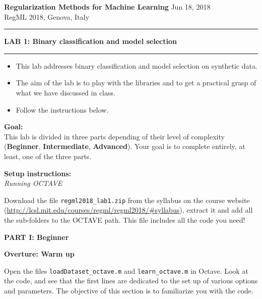 \documentclass[DIN, pagenumber=false, fontsize=11pt, parskip=half]{scrartcl}
\newcommand{\mytitle}[1]{{\noindent\LARGE\textbf{#1}}}
\newcommand{\mysection}[1]{\noindent\large\textbf{#1}}
\begin{document}
\noindent\textbf{Regularization Methods for Machine Learning} \hfill Jun 18, 2018\\
RegML 2018, Genova, Italy \\ \rule{\textwidth}{1pt}

\mytitle{LAB 1: Binary classification and model selection}
\rule{\textwidth}{1pt}
\begin{itemize}\itemsep1pt \parskip0pt 
  \item This lab addresses binary classification and model selection on synthetic data.
  \item The aim of the lab is to play with the libraries and to get a practical grasp of what we have discussed in class.
  \item Follow the instructions below.

\end{itemize}

\begin{framed}
\textbf{\textbf{Goal}:} \\
This lab is divided in three parts depending of their level of complexity (\textbf{Beginner}, \textbf{Intermediate}, \textbf{Advanced}). Your goal is to complete entirely, at least, one of the three parts.
\end{framed}


\begin{framed}
\textbf{\textbf{Setup instructions}:} \\
\textit{Running OCTAVE}

 Download the file \texttt{regml2018\_lab1.zip} from the syllabus on the course website (\url{http://lcsl.mit.edu/courses/regml/regml2018/\#syllabus}), extract it and add all the sub-folders to the OCTAVE path. This file includes all the code you need!
\end{framed}

\pagebreak
\begin{center}
\large\textbf{PART I: Beginner}
\end{center}

\mysection{Overture: Warm up}

\noindent Open the files \texttt{loadDataset\_octave.m} and \texttt{learn\_octave.m} in Octave.
Look at the code, and see that the first lines are dedicated to the set up of various options and parameters.
The objective of this section is to familiarize you with the code.
\end{document}
